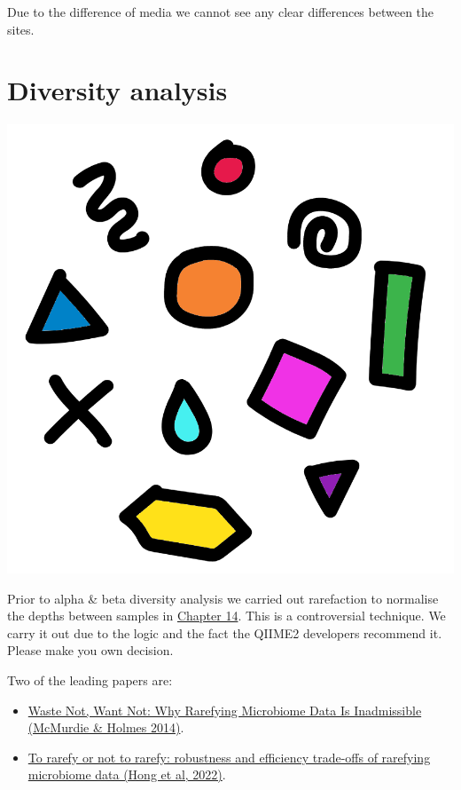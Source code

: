 \documentclass[
]{book}
\providecommand{\tightlist}{%
  \setlength{\itemsep}{0pt}\setlength{\parskip}{0pt}}
\begin{document}
Due to the difference of media we cannot see any clear differences between the sites.

\hypertarget{diversity-analysis}{%
\section{Diversity analysis}\label{diversity-analysis}}

\includegraphics{figures/diversity.png}

Prior to alpha \& beta diversity analysis we carried out rarefaction to normalise the depths between samples in \protect\hyperlink{rarefaction_chap}{Chapter 14}.
This is a controversial technique.
We carry it out due to the logic and the fact the QIIME2 developers recommend it.
Please make you own decision.

Two of the leading papers are:

\begin{itemize}
\tightlist
\item
  \href{https://journals.plos.org/ploscompbiol/article?id=10.1371/journal.pcbi.1003531}{Waste Not, Want Not: Why Rarefying Microbiome Data Is Inadmissible (McMurdie \& Holmes 2014)}.
\item
  \href{https://academic.oup.com/bioinformatics/article/38/9/2389/6536959}{To rarefy or not to rarefy: robustness and efficiency trade-offs of rarefying microbiome data (Hong et al, 2022)}.
\end{itemize}
\end{document}
